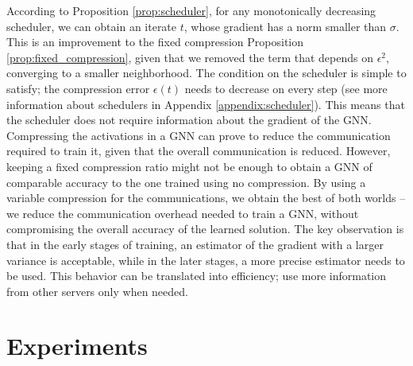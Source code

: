 \documentclass[lettersize,journal]{IEEEtran}
\begin{document}
According to Proposition \ref{prop:scheduler}, for any monotonically decreasing scheduler, we can obtain an iterate $t$, whose gradient has a norm smaller than $\sigma$. This is an improvement to the fixed compression Proposition \ref{prop:fixed_compression}, given that we removed the term that depends on $\epsilon^2$, converging to a smaller neighborhood. The condition on the scheduler is simple to satisfy; the compression error $\epsilon(t)$ needs to decrease on every step (see more information about schedulers in Appendix \ref{appendix:scheduler}). This means that the scheduler does not require information about the gradient of the GNN. 
Compressing the activations in a GNN can prove to reduce the communication required to train it, given that the overall communication is reduced. However, keeping a fixed compression ratio might not be enough to obtain a GNN of comparable accuracy to the one trained using no compression. By using a variable compression for the communications, we obtain the best of both worlds -- we reduce the communication overhead needed to train a GNN, without compromising the overall accuracy of the learned solution. The key observation is that in the early stages of training, an estimator of the gradient with a larger variance is acceptable, while in the later stages, a more precise estimator needs to be used. This behavior can be translated into efficiency; use more information from other servers only when needed. 

\section{Experiments}
\end{document}
